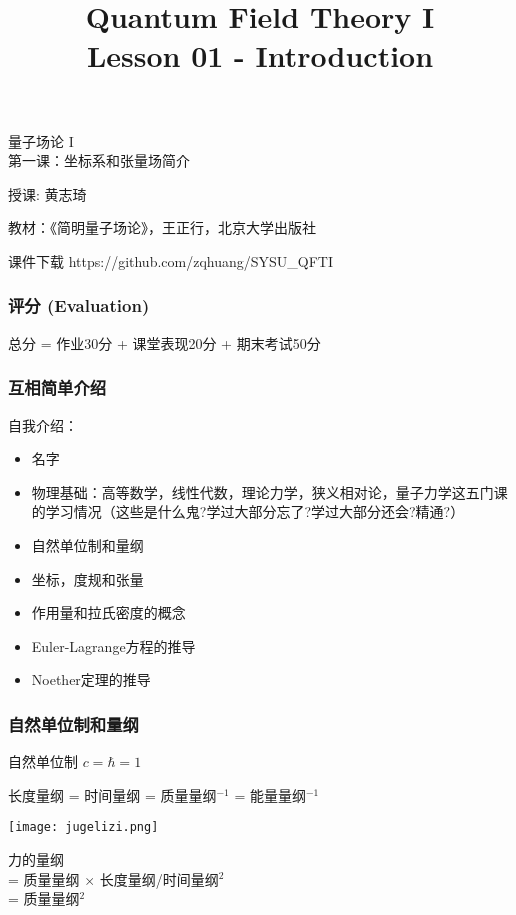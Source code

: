 \documentclass[CJK]{beamer}
\title{Quantum Field Theory I \\ Lesson 01 - Introduction}
\author{}
\date{}
\begin{document}
\begin{frame}
 
\begin{center}
\begin{Large}
\bch
量子场论 I \\
第一课：坐标系和张量场简介

{\vskip 0.3in}

授课: 黄志琦

\ech
\end{Large}
\end{center}

\vskip 0.2in

\bch
教材：《简明量子场论》，王正行，北京大学出版社
\ech

\bch
课件下载
\ech
https://github.com/zqhuang/SYSU\_QFTI

\end{frame}

\begin{frame}
\frametitle{\bch 评分 \ech (Evaluation)}
\bch
总分 = 作业30分 + 课堂表现20分  + 期末考试50分
\ech
\end{frame}

\begin{frame}
\frametitle{\bch 互相简单介绍 \ech}
\bch
自我介绍：
\begin{itemize}
\item{名字}
\item{物理基础：高等数学，线性代数，理论力学，狭义相对论，量子力学这五门课的学习情况（这些是什么鬼?学过大部分忘了?学过大部分还会?精通?）}
\end{itemize}
\ech
\end{frame}

\begin{frame}
\bch   
\begin{itemize}
\item{自然单位制和量纲}
\item{坐标，度规和张量}
\item{作用量和拉氏密度的概念}
\item{Euler-Lagrange方程的推导}
\item{Noether定理的推导}
\end{itemize}

\ech
\end{frame}

\begin{frame}
\frametitle{\bch 自然单位制和量纲 \ech}
\bch 自然单位制 \ech $c = \hbar  = 1$

\bch
长度量纲 = 时间量纲 = 质量量纲$^{-1}$ = 能量量纲$^{-1}$ 
\ech

{\vskip 0.2in}
\begin{minipage}{0.3\textwidth}
\texttt{[image: jugelizi.png]}
\end{minipage}
\begin{minipage}{0.6\textwidth}
\bch
力的量纲 \\
= 质量量纲 $\times$ 长度量纲/时间量纲$^2$ \\
= 质量量纲$^2$
\ech
\end{minipage}

\end{frame}
\end{document}
